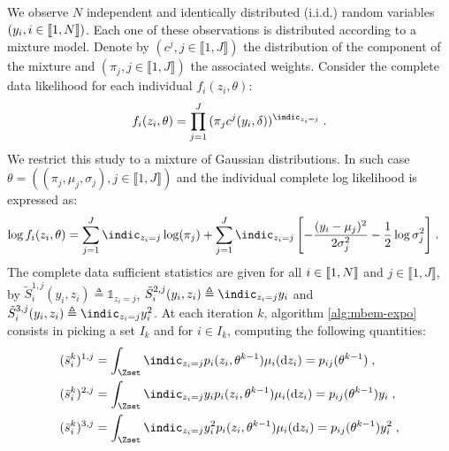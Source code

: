 \clearpage 
\begin{exmp}
We observe $N$ independent and identically distributed (i.i.d.) random variables $ (y_i, i \in \llbracket1,N\rrbracket)$. Each one of these observations is distributed according to a mixture model. Denote by $(c^j, j \in \llbracket 1, J \rrbracket)$ the distribution of the component of the mixture and $(\pi_j, j \in \llbracket 1, J \rrbracket)$ the associated weights. Consider the complete data likelihood for each individual $f_i( z_i, \theta)$:
\begin{align} \label{eq1}
f_i( z_i, \theta) = \prod_{j=1}^{J}{(\pi_j c^j(y_i,\delta))^{\indic_{z_i=j}}}\eqs.
\end{align}
We restrict this study to a mixture of Gaussian distributions. In such case $\theta = ((\pi_j, \mu_j, \sigma_j), j \in \llbracket 1, J \rrbracket)$ and the individual complete log likelihood is expressed as:
\begin{align}
\log f_i( z_i, \theta) & = \sum_{j=1}^{J}{\indic_{z_i=j}\log(\pi_j)} + \sum_{j=1}^{J}{\indic_{z_i=j}\left[-\frac{(y_i - \mu_j)^2}{2\sigma^2_j} - \frac{1}{2}\log \sigma^2_j\right]}\eqs.
\end{align}
The complete data sufficient statistics are given for all $i \in \llbracket1,N\rrbracket$ and $j \in \llbracket1,J\rrbracket$, by $\tilde{S}_i^{1,j}(y_i,z_i) \triangleq \mathbb{1}_{z_i=j}$, $\tilde{S}_i^{2,j}(y_i,z_i) \triangleq \indic_{z_i=j}y_i$ and $\tilde{S}_i^{3,j}(y_i,z_i) \triangleq \indic_{z_i=j}y_i^2$.
At each iteration $k$, algorithm \ref{alg:mbem-expo} consists in picking a set $I_k$ and for $i \in I_k$, computing the following quantities:
\begin{align}
& (\bar{s}_i^k)^{1,j} = \int_{\Zset}{\indic_{z_i=j}p_i(z_i,\theta^{k-1}) \mu_i(\dz_i)} = p_{ij}(\theta^{k-1})\eqs,\\
& (\bar{s}_i^k)^{2,j} = \int_{\Zset}{\indic_{z_i=j}y_ip_i(z_i,\theta^{k-1}) \mu_i(\dz_i)} = p_{ij}(\theta^{k-1})y_i\eqs,\\
& (\bar{s}_i^k)^{3,j} = \int_{\Zset}{\indic_{z_i=j}y_i^2p_i(z_i,\theta^{k-1}) \mu_i(\dz_i)} = p_{ij}(\theta^{k-1})y_i^2\eqs,
\end{align}

\end{exmp}

